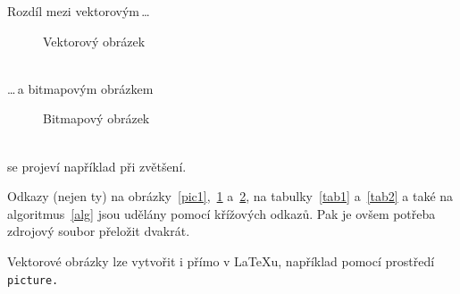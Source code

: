 \documentclass[a4paper,11pt]{article}[20-03-2022]
\begin{document}
\newpage
Rozdíl mezi vektorovým\,\dots
\begin{figure}[h]
    \centering
    \caption{Vektorový obrázek}
    \label{pic2}
\end{figure}
\bigskip
\\\dots\,a bitmapovým obrázkem
\begin{figure}[h]
    \centering
    \caption{Bitmapový obrázek}
    \label{pic3}
\end{figure}
\bigskip
\\se projeví například při zvětšení.

Odkazy (nejen ty) na obrázky~\ref{pic1},~\ref{pic2} a~\ref{pic3}, na tabulky~\ref{tab1} a~\ref{tab2} a také na algoritmus~\ref{alg} jsou udělány pomocí křížových odkazů. 
Pak je ovšem potřeba zdrojový soubor přeložit dvakrát.

Vektorové obrázky lze vytvořit i přímo v \LaTeX u, například pomocí prostředí\texttt{ picture.}
\end{document}

